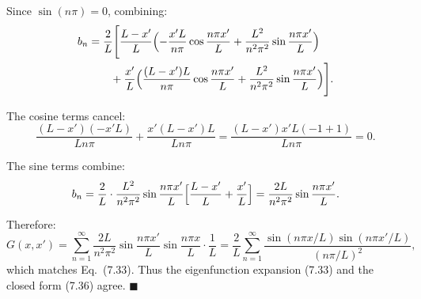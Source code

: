 \documentclass[12pt]{article}
\begin{document}
Since $\sin(n\pi) = 0$, combining:
\begin{align}
b_n &= \frac{2}{L}\Biggl[\frac{L-x'}{L}\Bigl(-\frac{x'L}{n\pi}\cos\frac{n\pi x'}{L} + \frac{L^2}{n^2\pi^2}\sin\frac{n\pi x'}{L}\Bigr) \\
&\qquad + \frac{x'}{L}\Bigl(\frac{(L-x')L}{n\pi}\cos\frac{n\pi x'}{L} + \frac{L^2}{n^2\pi^2}\sin\frac{n\pi x'}{L}\Bigr)\Biggr].
\end{align}

The cosine terms cancel:
\[
\frac{(L-x')(-x'L)}{Ln\pi} + \frac{x'(L-x')L}{Ln\pi} = \frac{(L-x')x'L(-1+1)}{Ln\pi} = 0.
\]

The sine terms combine:
\[
b_n = \frac{2}{L}\cdot\frac{L^2}{n^2\pi^2}\sin\frac{n\pi x'}{L}\Bigl[\frac{L-x'}{L} + \frac{x'}{L}\Bigr] = \frac{2L}{n^2\pi^2}\sin\frac{n\pi x'}{L}.
\]

Therefore:
\[
G(x,x') = \sum_{n=1}^{\infty}\frac{2L}{n^2\pi^2}\sin\frac{n\pi x'}{L}\sin\frac{n\pi x}{L} \cdot \frac{1}{L} = \frac{2}{L}\sum_{n=1}^{\infty}\frac{\sin(n\pi x/L)\sin(n\pi x'/L)}{(n\pi/L)^2},
\]
which matches Eq.\ (7.33). Thus the eigenfunction expansion (7.33) and the closed form (7.36) agree. $\blacksquare$
\end{document}
